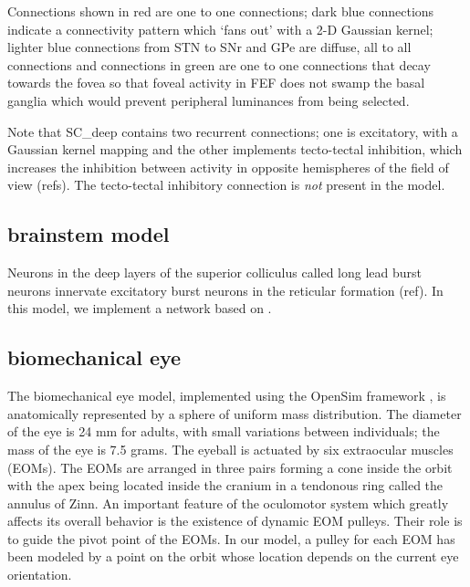 \documentclass{frontiersSCNS}
\begin{document}
Connections shown in red are one to one connections; dark blue
connections indicate a connectivity pattern which `fans out' with a 2-D
Gaussian kernel; lighter blue connections from STN to SNr and GPe are
diffuse, all to all connections and connections in green are one to one
connections that decay towards the fovea so that foveal activity in
FEF does not swamp the basal ganglia which would prevent peripheral
luminances from being selected.

Note that SC\_deep contains two recurrent connections; one is
excitatory, with a Gaussian kernel mapping and the other implements
tecto-tectal inhibition, which increases the inhibition between
activity in opposite hemispheres of the field of view (refs). The
tecto-tectal inhibitory connection is \emph{not} present in the \ccg
model.


\subsection{brainstem model}

Neurons in the deep layers of the superior colliculus called long lead
burst neurons innervate excitatory burst neurons in the reticular
formation (ref). In this model, we implement a network based
on \cite{gancarz_neural_1998}.

\subsection{biomechanical eye}



The biomechanical eye model, implemented using the OpenSim framework
\cite{seth_opensim:_2011}, is anatomically represented by a sphere of
uniform mass distribution. The diameter of the eye is 24 mm for adults,
with small variations between individuals; the mass of the eye is 7.5 grams.
The eyeball is actuated by six extraocular muscles
(EOMs). The EOMs are arranged in three pairs forming a cone inside the
orbit with the apex being located inside the cranium in a tendonous
ring called the annulus of Zinn. An important feature of the
oculomotor system which greatly affects its overall behavior is the
existence of dynamic EOM pulleys. Their role is to guide the pivot
point of the EOMs. In our model, a pulley for each EOM has been
modeled by a point on the orbit whose location depends on the current
eye orientation.
\end{document}
